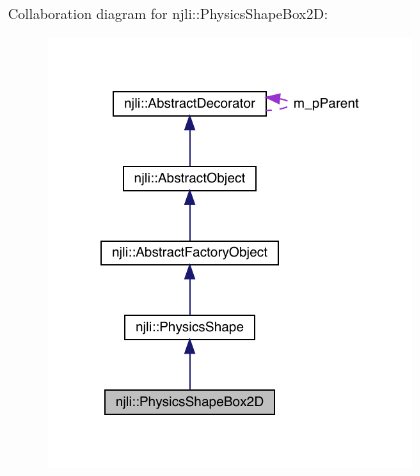 Collaboration diagram for njli\+:\+:Physics\+Shape\+Box2D\+:\nopagebreak
\begin{figure}[H]
\begin{center}
\leavevmode
\includegraphics[width=273pt]{classnjli_1_1_physics_shape_box2_d__coll__graph}
\end{center}
\end{figure}

